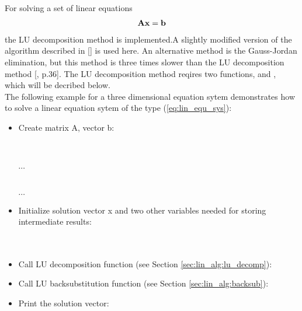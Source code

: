 For solving a set of linear equations 
\begin{eqnarray}
\label{eq:lin_equ_sys}
{\bf A} {\bf x} = {\bf b}
\end{eqnarray}
the LU decomposition method is implemented.A slightly modified version
of the algorithm described in
[\cite{numerical_recipes_C:97}] is used here. An alternative method
is the Gauss-Jordan elimination, but this method is three times
slower than the LU decomposition method
[\cite{numerical_recipes_C:97}, p.36]. The LU decomposition method
reqires two functions,  and ,
which will be decribed below.
\vspace{0.5cm}\\
The following example for a three dimensional equation sytem 
demonstrates how to solve a linear
equation sytem of the type
(\ref{eq:lin_equ_sys}):
\begin{itemize}
\item Create matrix A, vector b: \\
   \\
  \\
  \\
  $\cdots$\\
  \\
  \\
  $\cdots$
\item Initialize solution vector x and two other variables needed for
  storing intermediate results:\\
  \\
  \\
\item Call LU decomposition function (see Section \ref{sec:lin_alg:lu_decomp}): \\
\item Call LU backsubstitution function (see Section \ref{sec:lin_alg:backsub}): \\
\item Print the solution vector:\\
\end{itemize}

\label{sec:lin_alg:lu_decomp}

